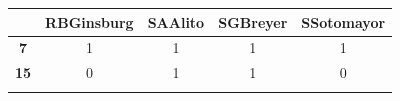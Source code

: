 \documentclass[12pt,twoside]{article}
\begin{document}
\begin{longtable}[c]{@{}ccccc@{}}
\toprule
\begin{minipage}[b]{0.11\columnwidth}\centering\strut
~
\strut\end{minipage} &
\begin{minipage}[b]{0.16\columnwidth}\centering\strut
RBGinsburg
\strut\end{minipage} &
\begin{minipage}[b]{0.12\columnwidth}\centering\strut
SAAlito
\strut\end{minipage} &
\begin{minipage}[b]{0.13\columnwidth}\centering\strut
SGBreyer
\strut\end{minipage} &
\begin{minipage}[b]{0.14\columnwidth}\centering\strut
SSotomayor
\strut\end{minipage}\tabularnewline
\midrule
\endhead
\begin{minipage}[t]{0.11\columnwidth}\centering\strut
\textbf{7}
\strut\end{minipage} &
\begin{minipage}[t]{0.16\columnwidth}\centering\strut
1
\strut\end{minipage} &
\begin{minipage}[t]{0.12\columnwidth}\centering\strut
1
\strut\end{minipage} &
\begin{minipage}[t]{0.13\columnwidth}\centering\strut
1
\strut\end{minipage} &
\begin{minipage}[t]{0.14\columnwidth}\centering\strut
1
\strut\end{minipage}\tabularnewline
\begin{minipage}[t]{0.11\columnwidth}\centering\strut
\textbf{15}
\strut\end{minipage} &
\begin{minipage}[t]{0.16\columnwidth}\centering\strut
0
\strut\end{minipage} &
\begin{minipage}[t]{0.12\columnwidth}\centering\strut
1
\strut\end{minipage} &
\begin{minipage}[t]{0.13\columnwidth}\centering\strut
1
\strut\end{minipage} &
\begin{minipage}[t]{0.14\columnwidth}\centering\strut
0
\strut\end{minipage}\tabularnewline
\begin{minipage}[t]{0.11\columnwidth}\centering\strut

\end{minipage}
\end{longtable}
\end{document}
